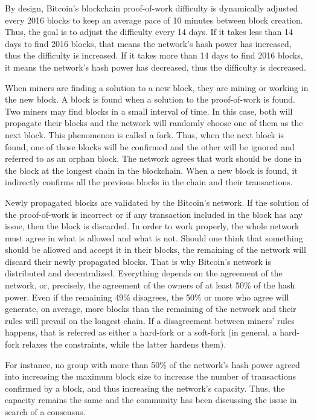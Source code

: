 By design, Bitcoin's blockchain proof-of-work difficulty is dynamically adjusted every 2016 blocks to keep an average pace of 10 minutes between block creation. Thus, the goal is to adjust the difficulty every 14 days. If it takes less than 14 days to find 2016 blocks, that means the network's hash power has increased, thus the difficulty is increased. If it takes more than 14 days to find 2016 blocks, it means the network's hash power has decreased, thus the difficulty is decreased.

When miners are finding a solution to a new block, they are mining or working in the new block. A block is found when a solution to the proof-of-work is found. Two miners may find blocks in a small interval of time. In this case, both will propagate their blocks and the network will randomly choose one of them as the next block. This phenomenon is called a fork. Thus, when the next block is found, one of those blocks will be confirmed and the other will be ignored and referred to as an orphan block. The network agrees that work should be done in the block at the longest chain in the blockchain. When a new block is found, it indirectly confirms all the previous blocks in the chain and their transactions.

Newly propagated blocks are validated by the Bitcoin's network. If the solution of the proof-of-work is incorrect or if any transaction included in the block has any issue, then the block is discarded. In order to work properly, the whole network must agree in what is allowed and what is not. Should one think that something should be allowed and accept it in their blocks, the remaining of the network will discard their newly propagated blocks. That is why Bitcoin's network is distributed and decentralized. Everything depends on the agreement of the network, or, precisely, the agreement of the owners of at least 50\% of the hash power. Even if the remaining 49\% disagrees, the 50\% or more who agree will generate, on average, more blocks than the remaining of the network and their rules will prevail on the longest chain. If a disagreement between miners' rules happens, that is referred as either a hard-fork or a soft-fork (in general, a hard-fork relaxes the constraints, while the latter hardens them).

For instance, no group with more than 50\% of the network's hash power agreed into increasing the maximum block size to increase the number of transactions confirmed by a block, and thus increasing the network's capacity. Thus, the capacity remains the same and the community has been discussing the issue in search of a consensus.

